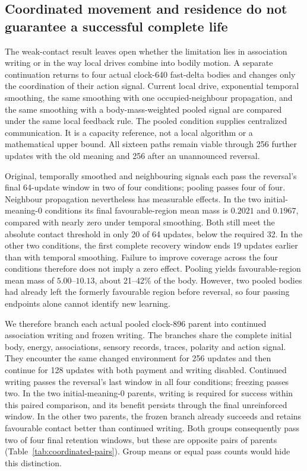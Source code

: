 \subsection*{Coordinated movement and residence do not guarantee a successful complete life}

The weak-contact result leaves open whether the limitation lies in association writing or in the way local drives combine into bodily motion. A separate continuation returns to four actual clock-640 fast-delta bodies and changes only the coordination of their action signal. Current local drive, exponential temporal smoothing, the same smoothing with one occupied-neighbour propagation, and the same smoothing with a body-mass-weighted pooled signal are compared under the same local feedback rule. The pooled condition supplies centralized communication. It is a capacity reference, not a local algorithm or a mathematical upper bound. All sixteen paths remain viable through 256 further updates with the old meaning and 256 after an unannounced reversal.

Original, temporally smoothed and neighbouring signals each pass the reversal's final 64-update window in two of four conditions; pooling passes four of four. Neighbour propagation nevertheless has measurable effects. In the two initial-meaning-0 conditions its final favourable-region mean mass is $0.2021$ and $0.1967$, compared with nearly zero under temporal smoothing. Both still meet the absolute contact threshold in only 20 of 64 updates, below the required 32. In the other two conditions, the first complete recovery window ends 19 updates earlier than with temporal smoothing. Failure to improve coverage across the four conditions therefore does not imply a zero effect. Pooling yields favourable-region mean mass of $5.00$--$10.13$, about 21--42\% of the body. However, two pooled bodies had already left the formerly favourable region before reversal, so four passing endpoints alone cannot identify new learning.

We therefore branch each actual pooled clock-896 parent into continued association writing and frozen writing. The branches share the complete initial body, energy, associations, sensory records, traces, polarity and action signal. They encounter the same changed environment for 256 updates and then continue for 128 updates with both payment and writing disabled. Continued writing passes the reversal's last window in all four conditions; freezing passes two. In the two initial-meaning-0 parents, writing is required for success within this paired comparison, and its benefit persists through the final unreinforced window. In the other two parents, the frozen branch already succeeds and retains favourable contact better than continued writing. Both groups consequently pass two of four final retention windows, but these are opposite pairs of parents (Table~\ref{tab:coordinated-pairs}). Group means or equal pass counts would hide this distinction.

